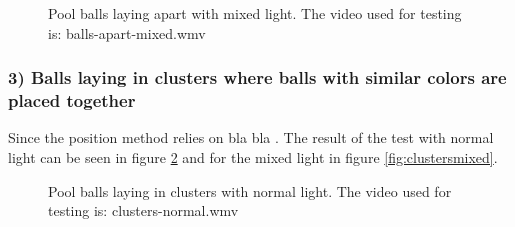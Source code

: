 
\begin{figure}[H]
  \centering
   \caption{Pool balls laying apart with mixed light.  The video used for testing is: balls-apart-mixed.wmv}
  \label{fig:apartmixed}
\end{figure}


\subsubsection{ 3) Balls laying in clusters where balls with similar colors are placed together}
Since the position method relies on bla bla  . The result of the test with normal light can be seen in figure \ref{fig:clustersnormal} and for the mixed light in figure \ref{fig:clustersmixed}.

\begin{figure}[H]
  \centering
  \quad
	\quad
   \caption{Pool balls laying in clusters with normal light. The video used for testing is: clusters-normal.wmv}
  \label{fig:clustersnormal}
\end{figure}

